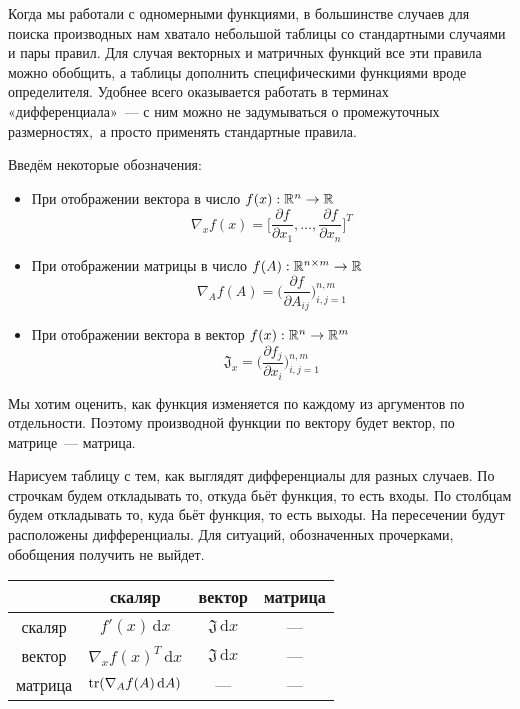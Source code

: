 \documentclass[12pt,fleqn]{article}
\newcommand{\dx}[1]{\,\mathrm{d}#1} %
\begin{document}
Когда мы работали с одномерными функциями, в большинстве случаев для поиска производных нам хватало небольшой таблицы со стандартными случаями и пары правил.
Для случая векторных и матричных функций все эти правила можно обобщить, а таблицы дополнить специфическими функциями вроде определителя.
Удобнее всего оказывается работать в терминах «дифференциала»~--- с ним можно не задумываться о промежуточных размерностях,~а просто применять стандартные правила.

Введём некоторые обозначения:
\begin{itemize}
    \item При отображении вектора в число $f(x): \mathbb{R}^n \to \mathbb{R}$ 
    \[
        \nabla_x f(x)
        =
        \bigg[
            \frac{\partial f}{\partial x_1},
            \dots,
            \frac{\partial f}{\partial x_n}
        \bigg]^T
    \]

    \item При отображении матрицы в число $f(A): \RR^{n \times m} \to \RR$
    \[
        \nabla_A f(A)
        =
        \bigg(
            \frac{\partial f}{\partial A_{ij}}
        \bigg)_{i,j=1}^{n,m}
    \]
    
    \item При отображении вектора в вектор $f(x): \mathbb{R}^n \to \mathbb{R}^m$
    \[
        \mathfrak{J}_x = \bigg(
            \frac{\partial f_{j}}{\partial x_{i}}
        \bigg)_{i,j=1}^{n,m}
    \]
\end{itemize}

Мы хотим оценить, как функция изменяется по каждому из аргументов по отдельности. Поэтому производной функции по вектору будет вектор, по матрице~--- матрица.

Нарисуем таблицу с тем, как выглядят дифференциалы для разных случаев. По строчкам будем откладывать то, откуда бьёт функция, то есть входы. По столбцам будем откладывать то, куда бьёт функция, то есть выходы. На пересечении будут расположены дифференциалы. Для ситуаций, обозначенных прочерками, обобщения получить не выйдет. 

\begin{center} 
    \begin{tabular}{|c|c|c|c|}
    \hline
        & скаляр & вектор & матрица \\
    \hline 
    скаляр & $f'(x) \dx{x}$  &  $\mathfrak{J} \dx{x}$  & ---          \\
    \hline
    вектор & $ \nabla_x f(x)^T \dx{x}$    &   $\mathfrak{J} \dx{x}$     &  ---        \\
    \hline
    матрица & $\Tr( \nabla_A f(A) \dx{A})$    &    ---    & ---        \\
    \hline
    \end{tabular}
\end{center} 
\end{document}
